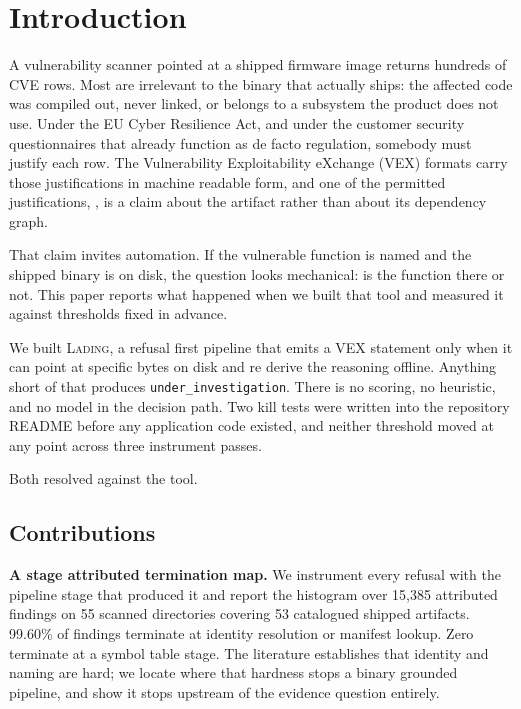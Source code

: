 \section{Introduction}

A vulnerability scanner pointed at a shipped firmware image returns hundreds of
CVE rows. Most are irrelevant to the binary that actually ships: the affected
code was compiled out, never linked, or belongs to a subsystem the product does
not use. Under the EU Cyber Resilience Act, and under the customer security
questionnaires that already function as de facto regulation, somebody must
justify each row. The Vulnerability Exploitability eXchange (VEX) formats carry
those justifications in machine readable form, and one of the permitted
justifications, \vcnp{}, is a claim about the
artifact rather than about its dependency graph.

That claim invites automation. If the vulnerable function is named and the
shipped binary is on disk, the question looks mechanical: is the function there
or not. This paper reports what happened when we built that tool and measured it
against thresholds fixed in advance.

We built \textsc{Lading}, a refusal first pipeline that emits a VEX statement
only when it can point at specific bytes on disk and re derive the reasoning
offline. Anything short of that produces \texttt{under\_investigation}. There is
no scoring, no heuristic, and no model in the decision path. Two kill tests were
written into the repository README before any application code existed, and
neither threshold moved at any point across three instrument passes.

Both resolved against the tool.

\subsection{Contributions}

\textbf{A stage attributed termination map.} We instrument every refusal with the
pipeline stage that produced it and report the histogram over 15,385 attributed
findings on 55 scanned directories covering 53 catalogued shipped artifacts.
99.60\% of findings terminate at identity resolution or manifest lookup. Zero
terminate at a symbol table stage. The literature establishes that identity and
naming are hard; we locate where that hardness stops a binary grounded pipeline,
and show it stops upstream of the evidence question entirely.

